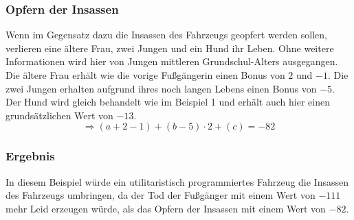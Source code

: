 \documentclass[a4paper, 12pt, openany]{book}
\begin{document}
                \subsubsection*{Opfern der Insassen}
                    Wenn im Gegensatz dazu die Insassen des Fahrzeugs geopfert werden sollen, verlieren eine ältere Frau, zwei Jungen und ein Hund ihr Leben. Ohne weitere Informationen wird hier von Jungen mittleren Grundschul-Alters ausgegangen. Die ältere Frau erhält wie die vorige Fußgängerin einen Bonus von $2$ und $-1$. Die zwei Jungen erhalten aufgrund ihres noch langen Lebens einen Bonus von $-5$. Der Hund wird gleich behandelt wie im Beispiel 1 und erhält auch hier einen grundsätzlichen Wert von $-13$.
                    $$\Rightarrow (a + 2 - 1) + (b - 5) \cdot 2 + (c) = -82$$
                
                \subsubsection*{Ergebnis}
                    In diesem Beispiel würde ein utilitaristisch programmiertes Fahrzeug die Insassen des Fahrzeugs umbringen, da der Tod der Fußgänger mit einem Wert von $-111$ mehr Leid erzeugen würde, als das Opfern der Insassen mit einem Wert von $-82$.
            
            \newpage
\end{document}
